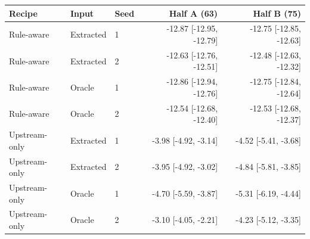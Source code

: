 \begin{tabular}{lllrr}
\toprule
Recipe & Input & Seed & Half A (63) & Half B (75) \\
\midrule
Rule-aware & Extracted & 1 & -12.87 [-12.95, -12.79] & -12.75 [-12.85, -12.63] \\
Rule-aware & Extracted & 2 & -12.63 [-12.76, -12.51] & -12.48 [-12.63, -12.32] \\
Rule-aware & Oracle & 1 & -12.86 [-12.94, -12.76] & -12.75 [-12.84, -12.64] \\
Rule-aware & Oracle & 2 & -12.54 [-12.68, -12.40] & -12.53 [-12.68, -12.37] \\
\midrule
Upstream-only & Extracted & 1 & -3.98 [-4.92, -3.14] & -4.52 [-5.41, -3.68] \\
Upstream-only & Extracted & 2 & -3.95 [-4.92, -3.02] & -4.84 [-5.81, -3.85] \\
Upstream-only & Oracle & 1 & -4.70 [-5.59, -3.87] & -5.31 [-6.19, -4.44] \\
Upstream-only & Oracle & 2 & -3.10 [-4.05, -2.21] & -4.23 [-5.12, -3.35] \\
\bottomrule
\end{tabular}

